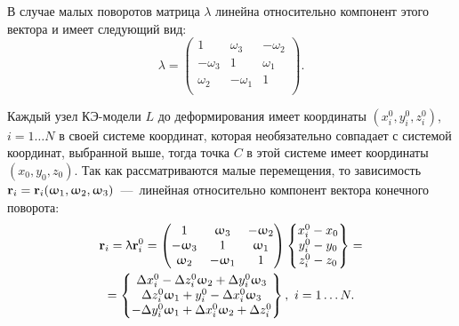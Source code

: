 В случае малых поворотов матрица $ \lambda $ линейна относительно компонент этого вектора и имеет следующий вид:
\begin{equation}
	\lambda =
	\begin{pmatrix}
		1 & \omega_3 & -\omega_2 \\
		-\omega_3 & 1 & \omega_1 \\
		\omega_2 & -\omega_1 & 1 \\
	\end{pmatrix}.
\end{equation}

Каждый узел КЭ-модели $ L $ до деформирования имеет координаты $ (x_i^0, y_i^0, z_i^0) $, $ i = 1 \hdots N $ в своей системе координат, которая необязательно совпадает с системой координат, выбранной выше, тогда точка $ C $ в этой системе имеет координаты $ (x_0, y_0, z_0) $. Так как рассматриваются малые перемещения, то зависимость $ \mathbf{r}_i = \mathbf{r}_i (\upomega_1, \upomega_2, \upomega_3) $~---~линейная относительно компонент вектора конечного поворота:
\begin{gather}
    \mathbf{r}_i = \uplambda \mathbf{r}_i^0 =
    \begin{pmatrix}
    1 & \upomega_3 & -\upomega_2 \\
    -\upomega_3 & 1 & \upomega_1 \\
    \upomega_2 & -\upomega_1 & 1 \\
    \end{pmatrix}
    \begin{Bmatrix}
        x_i^0 - x_0 \\
        y_i^0 - y_0 \\
        z_i^0 - z_0 \\
    \end{Bmatrix} = \nonumber \\
    = \begin{Bmatrix}
    \Delta x_i^0 - \Delta z_i^0 \upomega_2 + \Delta y_i^0 \upomega_3 \\
    \Delta z_i^0 \upomega_1 + y_i^0 - \Delta x_i^0 \upomega_3 \\
    -\Delta y_i^0 \upomega_1 + \Delta x_i^0 \upomega_2 + \Delta z_i^0 \\
    \end{Bmatrix}
    , \ i = 1 \hdots N.
    \label{eq:rotVecLin}
\end{gather}

